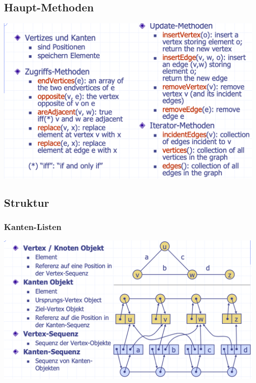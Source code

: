 \subsection{Haupt-Methoden}
\begin{center}
    \includegraphics[scale=.25]{graphic/11 Graph/Methoden.png}
\end{center}
\vspace{-8pt}


\subsection{Struktur}

\subsubsection{Kanten-Listen}

\begin{center}
    \includegraphics[scale=.23]{graphic/11 Graph/Kanten-Listen.png}
\end{center}
\vspace{-8pt}

